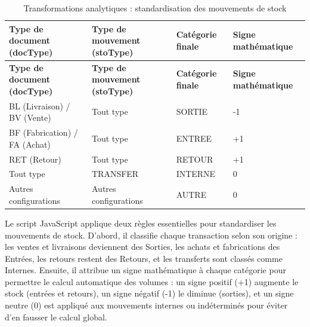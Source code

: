 { \small
\renewcommand{\arraystretch}{1.1}
\setlength{\tabcolsep}{4.5pt}

\begin{longtable}{|p{3.2cm}|p{3.2cm}|p{2.2cm}|p{2.2cm}|}
\caption{Transformations analytiques : standardisation des mouvements de stock} \\
\hline
\multicolumn{1}{|p{3.8cm}|}{\centering\arraybackslash\textbf{Type de document (docType)}} &
\multicolumn{1}{p{3.8cm}|}{\centering\arraybackslash\textbf{Type de mouvement (stoType)}} &
\multicolumn{1}{p{2.8cm}|}{\centering\arraybackslash\textbf{Catégorie finale}} &
\multicolumn{1}{p{3cm}|}{\centering\arraybackslash\textbf{Signe mathématique}} \\
\hline
\endfirsthead

\hline
\multicolumn{1}{|p{3.8cm}|}{\centering\arraybackslash\textbf{Type de document (docType)}} &
\multicolumn{1}{p{3.8cm}|}{\centering\arraybackslash\textbf{Type de mouvement (stoType)}} &
\multicolumn{1}{p{2.8cm}|}{\centering\arraybackslash\textbf{Catégorie finale}} &
\multicolumn{1}{p{3cm}|}{\centering\arraybackslash\textbf{Signe mathématique}} \\
\hline
\endhead

\hline
\endfoot

BL (Livraison) / BV (Vente) & Tout type & SORTIE & -1 \\
\hline

BF (Fabrication) / FA (Achat) & Tout type & ENTREE & +1 \\
\hline

RET (Retour) & Tout type & RETOUR & +1 \\
\hline

Tout type & TRANSFER & INTERNE & 0 \\
\hline

Autres configurations & Autres configurations & AUTRE & 0 \\
\hline

\end{longtable}

}
Le script JavaScript applique deux règles essentielles pour standardiser les mouvements de stock. D'abord, il classifie chaque transaction selon son origine : les ventes et livraisons deviennent des Sorties, les achats et fabrications des Entrées, les retours restent des Retours, et les transferts sont classés comme Internes. Ensuite, il attribue un signe mathématique à chaque catégorie pour permettre le calcul automatique des volumes : un signe positif (+1) augmente le stock (entrées et retours), un signe négatif (-1) le diminue (sorties), et un signe neutre (0) est appliqué aux mouvements internes ou indéterminés pour éviter d'en fausser le calcul global.\\

